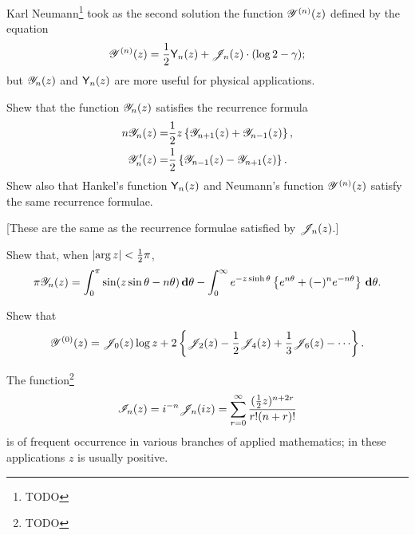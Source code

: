 Karl Neumann\footnote{TODO} took as the second solution the function
$\mathscr{Y}^{(n)}(z)$ defined by the equation
$$
\mathscr{Y}^{(n)}(z)
=
\frac{1}{2} \mathsf{Y}_{n}(z) + \mathscr{J}_{n}(z) \cdot (\log 2 - \gamma);
$$
but $\mathscr{Y}_{n}(z)$ and $\mathsf{Y}_{n}(z)$ are more useful for physical
applications.
\begin{wandwexample}
  Shew that the function $\mathscr{Y}_{n}(z)$ satisfies the recurrence formula
  \begin{align*}
    n \mathscr{Y}_{n}(z)
    =& \frac{1}{2} z \left\{  \mathscr{Y}_{n+1}(z) + \mathscr{Y}_{n-1}(z) \right\},
    \\
    \mathscr{Y}_{n}'(z)
    =& \frac{1}{2} \left\{  \mathscr{Y}_{n-1}(z) - \mathscr{Y}_{n+1}(z)   \right\}.
  \end{align*}
  Shew also that Hankel's function $\mathsf{Y}_{n}(z)$ and Neumann's
  function $\mathscr{Y}^{(n)}(z)$ satisfy the same recurrence formulae.

  [These are the same as the recurrence formulae satisfied by $\mathscr{J}_{n}(z)$.]
\end{wandwexample}
\begin{wandwexample}
  Shew that, when $\left| \arg z \right| < \frac{1}{2} \pi$,
  $$
  \pi \mathscr{Y}_{n}(z)
  =
  \int_{0}^{\pi}
  \sin (z \sin\theta - n\theta) \, \mathbf{d} \theta
  -
  \int_{0}^{\infty}
  e^{-z \sinh\theta} \left\{ e^{n\theta} + (-)^{n} e^{-n\theta} \right\} \, \mathbf{d}\theta.
  $$
\end{wandwexample}
\begin{wandwexample}
  Shew that
  $$
  \besY^{(0)}(z)
  =
  \besJ_{0}(z) \log z
  + 2 \thebrace{ \besJ_{2}(z) - \half \besJ_{4}(z) + \frac{1}{3} \besJ_{6}(z) - \cdots  }.
  $$
\end{wandwexample}

The function\footnote{TODO}
$$
\mathscr{I}_{n}(z)
=
i^{-n}
\mathscr{J}_{n}(iz)
=
\sum_{r=0}^{\infty}
\frac{(\frac{1}{2} z)^{n+2r}}{r!(n+r)!}
$$
%
%
is of frequent occurrence in various branches of applied
mathematics; in these applications $z$ is usually positive.

